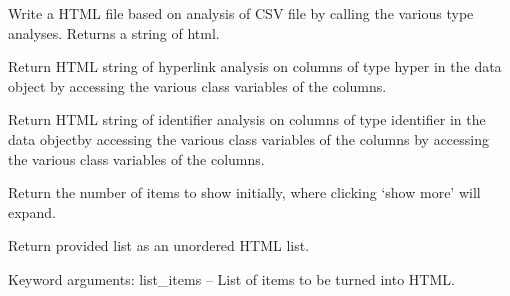 \documentclass[letterpaper,10pt,english]{sphinxmanual}
\begin{document}
\begin{fulllineitems}
\begin{fulllineitems}
\label{Code_rst/rep:report.Report.html_report}
Write a HTML file based on analysis of CSV file by calling the various
type analyses. Returns a string of html.

\end{fulllineitems}


\begin{fulllineitems}
\label{Code_rst/rep:report.Report.hyper_analysis}
Return HTML string of hyperlink analysis on columns of type hyper 
in the data object by accessing the various class variables of the
columns.

\end{fulllineitems}


\begin{fulllineitems}
\label{Code_rst/rep:report.Report.identifier_analysis}
Return HTML string of identifier analysis on columns of type identifier
in the data objectby accessing the various class variables of the
columns by accessing the various class variables of the
columns.

\end{fulllineitems}


\begin{fulllineitems}
\label{Code_rst/rep:report.Report.initial_show_items}
Return the number of items to show initially, where clicking `show more' will expand.

\end{fulllineitems}


\begin{fulllineitems}
\label{Code_rst/rep:report.Report.list_creator}
Return provided list as an unordered HTML list.

Keyword arguments:
list\_items -- List of items to be turned into HTML.


\end{fulllineitems}
\end{fulllineitems}
\end{document}

